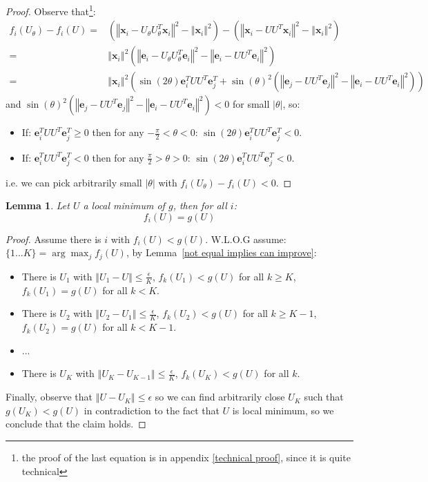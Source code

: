 \documentclass{article}
\newtheorem{lemma}[theorem]{Lemma}
\newcommand{\Lemmaref}[1]{Lemma~\ref{#1}}
\newcommand{\x}{{\mathbf x}}
\newcommand{\e}{{\mathbf e}}
\begin{document}
\begin{proof}
Observe that\footnote{the proof of the last equation is in appendix \ref{technical proof}, since it is quite technical}:
\begin{align*}
    f_i(U_{\theta})-f_i(U)=&\left(\left\Vert\x_{i}-U_{\theta}U_{\theta}^{T}\x_{i}\right\Vert^{2}-\left\Vert\x_{i}\right\Vert^{2}\right)-\left(\left\Vert\x_{i}-UU^{T}\x_{i}\right\Vert^{2}-\left\Vert\x_{i}\right\Vert^{2}\right)\\
    =&\left\Vert\x_{i}\right\Vert^{2}\left(\left\Vert\e_{i}-U_{\theta}U_{\theta}^{T}\e_{i}\right\Vert ^{2}-\left\Vert\e_{i}-UU^{T}\e_{i}\right\Vert^{2}\right)\\
    =& \left\Vert\x_{i}\right\Vert^{2}\left(\sin\left(2\theta\right)\e_{i}^{T}UU^{T}\e_{j}^{T}+\sin\left(\theta\right)^{2}\left(\left\Vert\e_{j}-UU^{T}\e_{j}\right\Vert^{2}-\left\Vert\e_{i}-UU^{T}\e_{i}\right\Vert^{2}\right)\right)
\end{align*}
and $\sin\left(\theta\right)^{2}\left(\left\Vert\e_{j}-UU^{T}\e_{j}\right\Vert^{2}-\left\Vert\e_{i}-UU^{T}\e_{i}\right\Vert^{2}\right)<0$ for small $|\theta|$, so:
\begin{itemize}
    \item If: $\e_{i}^{T}UU^{T}\e_{j}^{T} \ge 0$ then for any $-\frac{\pi}{2}<\theta<0$:  $\sin\left(2\theta\right)\e_{i}^{T}UU^{T}\e_{j}^{T}<0$.
    \item If: $\e_{i}^{T}UU^{T}\e_{j}^{T} < 0$ then for any $\frac{\pi}{2}>\theta>0$:  $\sin\left(2\theta\right)\e_{i}^{T}UU^{T}\e_{j}^{T}<0$.
\end{itemize}
i.e. we can pick arbitrarily small $|\theta|$ with $f_i(U_{\theta})-f_i(U)<0$.
\end{proof}


\begin{lemma} \label{local minimum equals}
Let $U$ a local minimum of $g$, then for all $i$: 
$$f_i(U)=g(U)$$
\end{lemma}
\begin{proof}
Assume there is $i$ with $f_i(U)<g(U)$. W.L.O.G assume: $\{1...K\}=\arg\max_jf_j(U)$, by \Lemmaref{not equal implies can improve}: 
\begin{itemize}
    \item There is $U_{1}$ with $\left\Vert U_{1}-U\right\Vert\le\frac{\epsilon}{K}$, $f_{k}(U_1)<g(U)$ for all $k\ge K$, $f_{k}(U_1)=g(U)$ for all $k< K$. 
    \item There is $U_{2}$ with $\left\Vert U_{2}-U_{1}\right\Vert\le\frac{\epsilon}{K}$, $f_{k}(U_2)<g(U)$ for all $k\ge K-1$, $f_{k}(U_2)=g(U)$ for all $k< K-1$.
    \item ...
    \item There is $U_{K}$ with $\left\Vert U_{K}-U_{K-1}\right\Vert\le\frac{\epsilon}{K}$, $f_{k}(U_K)<g(U)$ for all $k$. 
\end{itemize}
Finally, observe that $\left\Vert U-U_{K}\right\Vert\le{\epsilon}$ so we can find arbitrarily close $U_K$ such that $g(U_{K})<g(U)$ in contradiction to the fact that $U$ is local minimum, so we conclude that the claim holds.
\end{proof}
\end{document}
